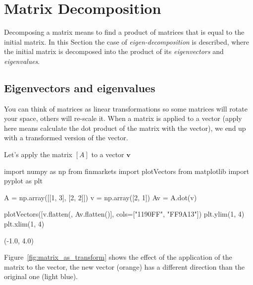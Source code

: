 \section{Matrix Decomposition}
\label{eigendecomposition}

Decomposing a matrix means to find a product of matrices that is equal to the initial matrix. In this Section the case of \emph{eigen-decomposition} is described, where the initial matrix is decomposed into the product of its \emph{eigenvectors} and \emph{eigenvalues}.

\subsection{Eigenvectors and eigenvalues}
\label{eigenvectors-and-eigenvalues}

You can think of matrices as linear transformations so some matrices will rotate your space, others will re-scale it. When a matrix is applied to a vector (apply here means calculate the dot product of the matrix with the vector), we end up with a transformed version of the vector.

Let's apply the matrix \([A]\) to a vector $\mathbf{v}$

\begin{ipython}
import numpy as np
from finmarkets import plotVectors
from matplotlib import pyplot as plt

A = np.array([[1, 3], [2, 2]])	
v = np.array([2, 1])
Av = A.dot(v)

plotVectors([v.flatten({}, Av.flatten()], cols=["1190FF", "FF9A13"])
plt.ylim(1, 4)
plt.xlim(1, 4)
\end{ipython}
\begin{ioutput}
(-1.0, 4.0)
\end{ioutput}

Figure~\ref{fig:matrix_as_transform} shows the effect of the application of the matrix to the vector, the new vector (orange) has a different direction than the original one (light blue).

